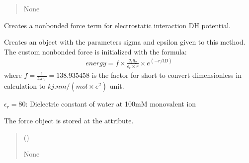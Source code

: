 \documentclass[letterpaper,10pt,english]{sphinxmanual}
\begin{document}
\begin{fulllineitems}
\begin{fulllineitems}
\begin{quote}
\begin{description}
\sphinxAtStartPar
None

\end{description}\end{quote}

\end{fulllineitems}


\begin{fulllineitems}
\label{\detokenize{modules/system:hps.core.system.addYukawaForces}}
\pysigstartsignatures
{}
\pysigstopsignatures
\sphinxAtStartPar
Creates a nonbonded force term for electrostatic interaction DH potential.

\sphinxAtStartPar
Creates an  object with the parameters
sigma and epsilon given to this method. The custom non\sphinxhyphen{}bonded force
is initialized with the formula:
\begin{equation*}
\begin{split}energy = f \times \frac{q_1q_2}{\epsilon_r \times r}\times e^{(-r/lD)}\end{split}
\end{equation*}
\sphinxAtStartPar
where \(f=\frac{1}{4\pi\epsilon_0}=138.935458\) is the factor for short to convert dimensionless
in calculation to \(kj.nm/(mol\times e^2)\) unit.

\sphinxAtStartPar
\(\epsilon_r=80\): Dielectric constant of water at 100mM mono\sphinxhyphen{}valent ion

\sphinxAtStartPar
The force object is stored at the  attribute.
\begin{quote}\begin{description}
\sphinxAtStartPar
{} (\sphinxstyleliteralemphasis{\sphinxupquote{(}}\sphinxstyleliteralemphasis{\sphinxupquote{) }}\sphinxstyleliteralemphasis{\sphinxupquote{, }}) \textendash{} 

\sphinxAtStartPar
None


\end{description}
\end{quote}
\end{fulllineitems}
\end{fulllineitems}
\end{document}
